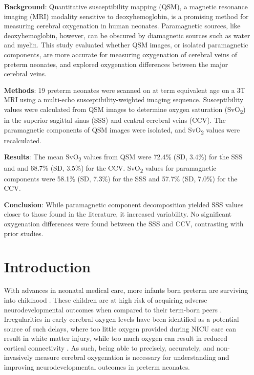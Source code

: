 \documentclass[
true
]{sn-jnl}
\begin{document}
\textbf{Background}: Quantitative susceptibility mapping (QSM), a
magnetic resonance imaging (MRI) modality sensitive to deoxyhemoglobin,
is a promising method for measuring cerebral oxygenation in human
neonates. Paramagnetic sources, like deoxyhemoglobin, however, can be
obscured by diamagnetic sources such as water and myelin. This study
evaluated whether QSM images, or isolated paramagnetic components, are
more accurate for measuring oxygenation of cerebral veins of preterm
neonates, and explored oxygenation differences between the major
cerebral veins.

\textbf{Methods}: 19 preterm neonates were scanned on at term equivalent
age on a 3T MRI using a multi-echo susceptibility-weighted imaging
sequence. Susceptibility values were calculated from QSM images to
determine oxygen saturation (SvO\textsubscript{2}) in the superior
sagittal sinus (SSS) and central cerebral veins (CCV). The paramagnetic
components of QSM images were isolated, and SvO\textsubscript{2} values
were recalculated.

\textbf{Results}: The mean SvO\textsubscript{2} values from QSM were
72.4\% (SD, 3.4\%) for the SSS and and 68.7\% (SD, 3.5\%) for the CCV.
SvO\textsubscript{2} values for paramagnetic components were 58.1\% (SD,
7.3\%) for the SSS and 57.7\% (SD, 7.0\%) for the CCV.

\textbf{Conclusion}: While paramagnetic component decomposition yielded
SSS values closer to those found in the literature, it increased
variability. No significant oxygenation differences were found between
the SSS and CCV, contrasting with prior studies.

\newpage{}

\section{Introduction}\label{sec-intro}

With advances in neonatal medical care, more infants born preterm are
surviving into childhood \citep{mckenzieScaffoldingParentingHealth2022}.
These children are at high risk of acquiring adverse neurodevelopmental
outcomes when compared to their term-born peers
\citep{twilhaarCognitiveOutcomesChildren2018}. Irregularities in early
cerebral oxygen levels have been identified as a potential source of
such delays, where too little oxygen provided during NICU care can
result in white matter injury, while too much oxygen can result in
reduced cortical connectivity \citep{rantakariEarlyOxygenLevels2021}. As
such, being able to precisely, accurately, and non-invasively measure
cerebral oxygenation is necessary for understanding and improving
neurodevelopmental outcomes in preterm neonates.
\end{document}
